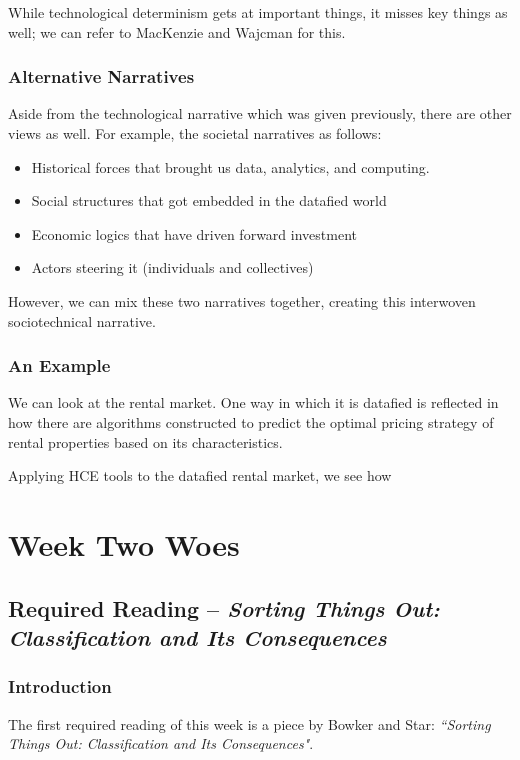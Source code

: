 \documentclass[openany]{book}
\begin{document}
While technological determinism gets at important things, it misses key things as well; we can refer to MacKenzie and Wajcman for this.

\subsection{Alternative Narratives}
Aside from the technological narrative which was given previously, there are other views as well. For example, the societal narratives as follows:
\begin{itemize}
	\item Historical forces that brought us data, analytics, and computing.
	\item Social structures that got embedded in the datafied world
	\item Economic logics that have driven forward investment
	\item Actors steering it (individuals and collectives)
\end{itemize}

However, we can mix these two narratives together, creating this interwoven sociotechnical narrative.

\subsection{An Example}
\begin{example}
	We can look at the rental market. One way in which it is datafied is reflected in how there are algorithms constructed to predict the optimal pricing strategy of rental properties based on its characteristics.
	
	Applying HCE tools to the datafied rental market, we see how 
\end{example}

\chapter{Week Two Woes}
\section{Required Reading -- \textit{Sorting Things Out: Classification and Its Consequences}}
\subsection{Introduction}
The first required reading of this week is a piece by Bowker and Star: \textit{``Sorting Things Out: Classification and Its Consequences"}.
\end{document}
